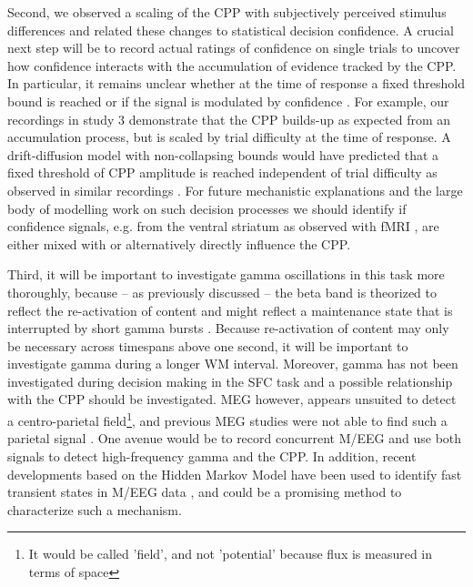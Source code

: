 Second, we observed a scaling of the CPP with subjectively perceived stimulus differences and related these changes to statistical decision confidence. A crucial next step will be to record actual ratings of confidence on single trials to uncover how confidence interacts with the accumulation of evidence tracked by the CPP. In particular, it remains unclear whether at the time of response a fixed threshold bound is reached or if the signal is modulated by confidence \parencite{Gherman2015,Kelly2013,Kelly2015,Philiastides2014,Twomey2016}. For example, our recordings in study 3 demonstrate that the CPP builds-up as expected from an accumulation process, but is scaled by trial difficulty at the time of response. A drift-diffusion model with non-collapsing bounds would have predicted that a fixed threshold of CPP amplitude is reached independent of trial difficulty as observed in similar recordings \parencite{Kelly2013}. For future mechanistic explanations and the large body of modelling work on such decision processes we should identify if confidence signals, e.g. from the ventral striatum as observed with fMRI \parencite{Hebart2016}, are either mixed with or alternatively directly influence the CPP. 

Third, it will be important to investigate gamma oscillations in this task more thoroughly, because – as previously discussed – the beta band is theorized to reflect the re-activation of content \parencite{Spitzer2017} and might reflect a maintenance state that is interrupted by short gamma bursts \parencite{Lundqvist2018,Lundqvist2016}. Because re-activation of content may only be necessary across timespans above one second, it will be important to investigate gamma during a longer WM interval. Moreover, gamma has not been investigated during decision making in the SFC task and a possible relationship with the CPP should be investigated. MEG however, appears unsuited to detect a centro-parietal field\footnote{It would be called 'field', and not 'potential' because flux is measured in terms of space}, and previous MEG studies were not able to find such a parietal signal \parencite[e.g.,][]{Donner2009}. One avenue would be to record concurrent M/EEG and use both signals to detect high-frequency gamma and the CPP. In addition, recent developments based on the Hidden Markov Model  have been used to identify fast transient states in M/EEG data \parencite{Vidaurre2018,Vidaurre2016}, and could be a promising method to characterize such a mechanism. 

